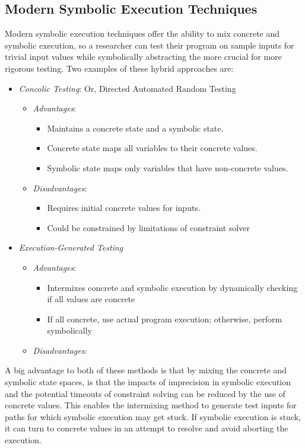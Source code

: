 \documentclass[11pt, journal]{IEEEtran}
\begin{document}
\subsection{Modern Symbolic Execution Techniques}
Modern symbolic execution techniques offer the ability to mix concrete and symbolic execution, so a researcher can test their program on sample inputs for trivial input values while symbolically abstracting the more crucial for more rigorous testing. Two examples of these hybrid approaches are:
\begin{itemize}
	\item \textit{Concolic Testing}: Or, Directed Automated Random Testing
	\begin{itemize}
		\item \textit{Advantages}: 
		\begin{itemize}
			\item Maintains a concrete state and a symbolic state.
			\item Concrete state maps all variables to their concrete values.
			\item Symbolic state maps only variables that have non-concrete values.
		\end{itemize}
		\item \textit{Disadvantages}: 
		\begin{itemize}
			\item Requires initial concrete values for inputs.
			\item Could be constrained by limitations of constraint solver
		\end{itemize}
	\end{itemize}
	\item \textit{Execution-Generated Testing}
	\begin{itemize}
		\item \textit{Advantages}:
		\begin{itemize}
			\item Intermixes concrete and symbolic execution by dynamically checking if all values are concrete
			\item If all concrete, use actual program execution; otherwise, perform symbolically
		\end{itemize}
		\item \textit{Disadvantages}: 
	\end{itemize}
\end{itemize}
A big advantage to both of these methods is that by mixing the concrete and symbolic state spaces, is that the impacts of imprecision in symbolic execution and the potential timeouts of constraint solving can be reduced by the use of concrete values. This enables the intermixing method to generate test inputs for paths for which symbolic execution may get stuck. If symbolic execution is stuck, it can turn to concrete values in an attempt to resolve and avoid aborting the execution.
\end{document}
